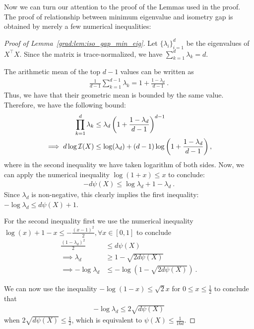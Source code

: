 Now we can turn our attention to the proof of the Lemmas used in the proof. The proof of relationship between minimum eigenvalue and isometry gap is obtained by merely a few numerical inequalities:  
\begin{proof}[Proof of Lemma~\ref{grad:lem:iso_gap_min_eig}]
    
Let $\{\lambda_i\}_{i=1}^d$ be the eigenvalues of $X^\top X$. Since the matrix is trace-normalized, we have $\sum_{k=1}^d \lambda_k = d$.

The arithmetic mean of the top $d-1$ values can be written as
\begin{align}
    \frac{1}{d-1}\sum_{k=1}^{d-1}\lambda_k 
    = 1 + \frac{1-\lambda_d}{d-1}~.
\end{align}
Thus, we have that their geometric mean is bounded by the same value. 
Therefore, we have the following bound:
\begin{align}
    \prod_{k=1}^d\lambda_k 
    &\leq \lambda_d \left(1+\frac{1-\lambda_d}{d-1}\right)^{d-1} \\
    \implies d\log\mathcal{I}(X) &\le \log(\lambda_d) + (d-1)\log\left(1+\frac{1-\lambda_d}{d-1}\right),
\end{align}
where in the second inequality we have taken logarithm of both sides. Now, we can apply the numerical inequality $\log(1+x)\le x$ to conclude:
\begin{align}
    -d\psi(X)\le \log\lambda_d + 1 - \lambda_d~.
\end{align}
Since $\lambda_d$ is non-negative, this clearly implies the first inequality: $-\log\lambda_d\le d\psi(X)+1$. 
    
For the second inequality first we use the numerical inequality $\log(x)+1-x \le -\frac{(x-1)^2}{2}, \forall x\in[0,1]$ to conclude 
\begin{align}
    \frac{(1-\lambda_d)^2}{2} &\le d\psi(X) \\
    \implies \lambda_d &\ge 1-\sqrt{2d\psi(X)} \\
    \implies -\log\lambda_d &\le -\log(1-\sqrt{2d\psi(X)})~.
\end{align}

We can now use the inequality $-\log(1-x) \leq \sqrt{2}x$ for $0\leq x\le \frac{1}{2}$ to conclude that
\begin{align}
    -\log\lambda_d\le 2\sqrt{d\psi(X)}
\end{align}
when $2\sqrt{d\psi(X)}\le \frac12$, which is equivalent to $\psi(X)\le \frac{1}{16d}$.

\end{proof}


